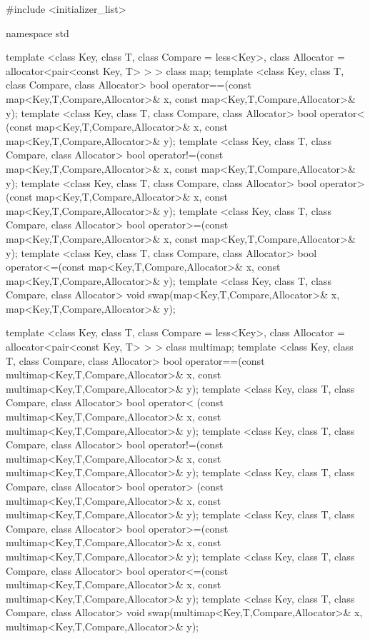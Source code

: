 %
\begin{codeblock}
#include <initializer_list>

namespace std {

  template <class Key, class T, class Compare = less<Key>,
            class Allocator = allocator<pair<const Key, T> > >
    class map;
  template <class Key, class T, class Compare, class Allocator>
    bool operator==(const map<Key,T,Compare,Allocator>& x,
                    const map<Key,T,Compare,Allocator>& y);
  template <class Key, class T, class Compare, class Allocator>
    bool operator< (const map<Key,T,Compare,Allocator>& x,
                    const map<Key,T,Compare,Allocator>& y);
  template <class Key, class T, class Compare, class Allocator>
    bool operator!=(const map<Key,T,Compare,Allocator>& x,
                    const map<Key,T,Compare,Allocator>& y);
  template <class Key, class T, class Compare, class Allocator>
    bool operator> (const map<Key,T,Compare,Allocator>& x,
                    const map<Key,T,Compare,Allocator>& y);
  template <class Key, class T, class Compare, class Allocator>
    bool operator>=(const map<Key,T,Compare,Allocator>& x,
                    const map<Key,T,Compare,Allocator>& y);
  template <class Key, class T, class Compare, class Allocator>
    bool operator<=(const map<Key,T,Compare,Allocator>& x,
                    const map<Key,T,Compare,Allocator>& y);
  template <class Key, class T, class Compare, class Allocator>
    void swap(map<Key,T,Compare,Allocator>& x,
              map<Key,T,Compare,Allocator>& y);

  template <class Key, class T, class Compare = less<Key>,
            class Allocator = allocator<pair<const Key, T> > >
    class multimap;
  template <class Key, class T, class Compare, class Allocator>
    bool operator==(const multimap<Key,T,Compare,Allocator>& x,
                    const multimap<Key,T,Compare,Allocator>& y);
  template <class Key, class T, class Compare, class Allocator>
    bool operator< (const multimap<Key,T,Compare,Allocator>& x,
                    const multimap<Key,T,Compare,Allocator>& y);
  template <class Key, class T, class Compare, class Allocator>
    bool operator!=(const multimap<Key,T,Compare,Allocator>& x,
                    const multimap<Key,T,Compare,Allocator>& y);
  template <class Key, class T, class Compare, class Allocator>
    bool operator> (const multimap<Key,T,Compare,Allocator>& x,
                    const multimap<Key,T,Compare,Allocator>& y);
  template <class Key, class T, class Compare, class Allocator>
    bool operator>=(const multimap<Key,T,Compare,Allocator>& x,
                    const multimap<Key,T,Compare,Allocator>& y);
  template <class Key, class T, class Compare, class Allocator>
    bool operator<=(const multimap<Key,T,Compare,Allocator>& x,
                    const multimap<Key,T,Compare,Allocator>& y);
  template <class Key, class T, class Compare, class Allocator>
    void swap(multimap<Key,T,Compare,Allocator>& x,
              multimap<Key,T,Compare,Allocator>& y);
}
\end{codeblock}

